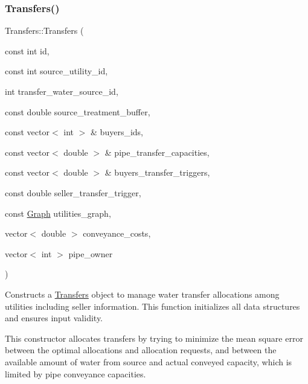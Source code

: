 \subsubsection{\texorpdfstring{Transfers()}{Transfers()}\hspace{0.1cm}{\footnotesize\ttfamily [2/3]}}
{\footnotesize\ttfamily Transfers\+::\+Transfers (\begin{DoxyParamCaption}\item[{const int}]{id,  }\item[{const int}]{source\+\_\+utility\+\_\+id,  }\item[{int}]{transfer\+\_\+water\+\_\+source\+\_\+id,  }\item[{const double}]{source\+\_\+treatment\+\_\+buffer,  }\item[{const vector$<$ int $>$ \&}]{buyers\+\_\+ids,  }\item[{const vector$<$ double $>$ \&}]{pipe\+\_\+transfer\+\_\+capacities,  }\item[{const vector$<$ double $>$ \&}]{buyers\+\_\+transfer\+\_\+triggers,  }\item[{const double}]{seller\+\_\+transfer\+\_\+trigger,  }\item[{const \mbox{\hyperlink{classGraph}{Graph}}}]{utilities\+\_\+graph,  }\item[{vector$<$ double $>$}]{conveyance\+\_\+costs,  }\item[{vector$<$ int $>$}]{pipe\+\_\+owner }\end{DoxyParamCaption})}



Constructs a \mbox{\hyperlink{classTransfers}{Transfers}} object to manage water transfer allocations among utilities including seller information. This function initializes all data structures and ensures input validity. 

This constructor allocates transfers by trying to minimize the mean square error between the optimal allocations and allocation requests, and between the available amount of water from source and actual conveyed capacity, which is limited by pipe conveyance capacities.


